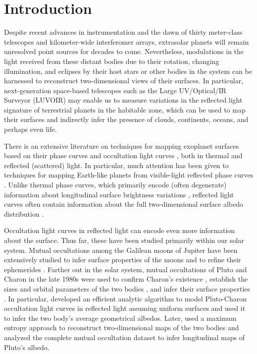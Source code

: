 \documentclass[modern]{aastex62}
\begin{document}
%
\section{Introduction}
\label{sec:intro}
%

Despite recent advances in instrumentation and the dawn of
thirty meter-class telescopes and kilometer-wide interferomer arrays,
extrasolar planets will remain unresolved point sources for decades
to come. Nevertheless, modulations in the light received from these distant
bodies due to their rotation, changing illumination, and eclipses
by their host stars or other bodies in the system can be harnessed to
reconstruct two-dimensional views of their surfaces.
In particular, next-generation space-based telescopes such as the
Large UV/Optical/IR Surveyor (LUVOIR) may enable us to measure
variations in the reflected light signature of terrestrial planets in
the habitable zone, which can be used to map their surfaces and
indirectly infer the presence of clouds, continents, oceans, and perhaps
even life.

There is an extensive literature on techniques for mapping exoplanet surfaces
based on their phase curves
\citep[e.g.,][]{Russell1906,Lacis1972,Knutson2007,Cowan2008,Oakley2009,Berdyugina2017,PaperI,PaperII}
and occultation light curves
\citep[e.g.,][]{Williams2006,Rauscher2007,Majeau2012,deWit2012,Rauscher2018},
both in thermal and reflected (scattered) light.
In particular, much attention has been given to techniques for mapping
Earth-like planets from visible-light reflected phase curves
\citep[e.g.,][]{Ford2001,Kawahara2010,Kawahara2011,Fujii2012,Kawahara2020,Aizawa2020}.
Unlike thermal phase curves, which primarily encode (often degenerate)
information about longitudinal surface brightness variations
\citep{Russell1906}, reflected light curves often contain information
about the full two-dimensional surface albedo distribution
\citep[e.g.,][]{Kawahara2010}.

Occultation light curves in reflected light can encode even more information
about the surface. Thus far, these have been studied primarily within our
solar system. Mutual occultations among the Galilean moons of Jupiter
have been extensively studied to infer surface properties of the moons and to refine
their ephemerides
\citep[e.g.,][]{Arlot1974,Aksnes1984,Arlot2014,deKleer2017,Saquet2018,Morgado2019,Bartolic2021}.
Farther out in the solar system,
mutual occultations of Pluto and Charon in the late 1980s
were used to confirm Charon's existence
\citep{Stern1992},
establish the sizes and orbital parameters of the two bodies
\citep{Tholen1990},
and infer their surface properties
\citep{Marcialis1990}.
In particular, \citet{Dunbar1986} developed an efficient analytic
algorithm to model Pluto-Charon occultation light curves in reflected light
assuming uniform surfaces and used it to infer the two body's
average geometrical albedos. Later,
\citet{Buie1992} used a maximum entropy approach to reconstruct two-dimensional
maps of the two bodies and
\citet{Reinsch1994} analyzed
the complete mutual occultation dataset to infer longitudinal maps of Pluto's
albedo.
\end{document}
